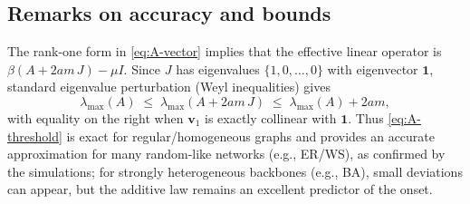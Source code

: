 \documentclass[pdflatex,sn-mathphys-num]{sn-jnl}%
\theoremstyle{thmstyleone}%
\theoremstyle{thmstyletwo}%
\theoremstyle{thmstylethree}%
\begin{document}
\begin{appendices}
\subsection{Remarks on accuracy and bounds}
The rank-one form in \eqref{eq:A-vector} implies that the effective linear operator is
$\beta(A+2am\,J)-\mu I$. Since $J$ has eigenvalues $\{1,0,\dots,0\}$ with eigenvector
$\mathbf{1}$, standard eigenvalue perturbation (Weyl inequalities) gives
\[
  \lambda_{\max}(A) \;\le\; \lambda_{\max}(A+2am\,J) \;\le\; \lambda_{\max}(A) + 2am,
\]
with equality on the right when $\mathbf{v}_1$ is exactly collinear with $\mathbf{1}$.
Thus \eqref{eq:A-threshold} is exact for regular/homogeneous graphs and provides an
accurate approximation for many random-like networks (e.g., ER/WS), as confirmed by
the simulations; for strongly heterogeneous backbones (e.g., BA), small deviations can
appear, but the additive law remains an excellent predictor of the onset.
\end{appendices}

\clearpage
\end{document}
